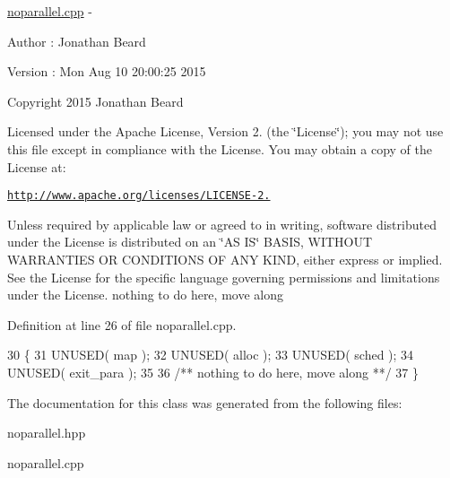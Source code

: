 \hyperlink{noparallel_8cpp_source}{noparallel.\+cpp} -\/ \begin{DoxyAuthor}{Author}
\+: Jonathan Beard 
\end{DoxyAuthor}
\begin{DoxyVersion}{Version}
\+: Mon Aug 10 20\+:00\+:25 2015
\end{DoxyVersion}
Copyright 2015 Jonathan Beard

Licensed under the Apache License, Version 2. (the \char`\"{}\+License\char`\"{}); you may not use this file except in compliance with the License. You may obtain a copy of the License at\+:

\href{http://www.apache.org/licenses/LICENSE-2.0}{\tt http\+://www.\+apache.\+org/licenses/\+L\+I\+C\+E\+N\+S\+E-\/2.}

Unless required by applicable law or agreed to in writing, software distributed under the License is distributed on an \char`\"{}\+A\+S I\+S\char`\"{} B\+A\+S\+IS, W\+I\+T\+H\+O\+UT W\+A\+R\+R\+A\+N\+T\+I\+ES OR C\+O\+N\+D\+I\+T\+I\+O\+NS OF A\+NY K\+I\+ND, either express or implied. See the License for the specific language governing permissions and limitations under the License. nothing to do here, move along 

Definition at line 26 of file noparallel.\+cpp.


\begin{DoxyCode}
30 \{
31    UNUSED( map );
32    UNUSED( alloc );
33    UNUSED( sched );
34    UNUSED( exit\_para );
35 \textcolor{comment}{}
36 \textcolor{comment}{   /** nothing to do here, move along **/}
37 \}
\end{DoxyCode}


The documentation for this class was generated from the following files\+:\begin{DoxyCompactItemize}
\item 
noparallel.\+hpp\item 
noparallel.\+cpp\end{DoxyCompactItemize}
